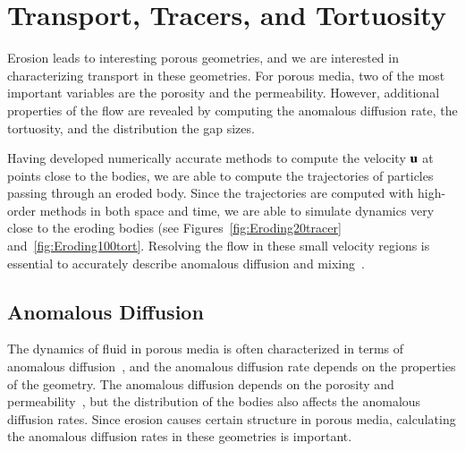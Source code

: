 \documentclass[preprint, 10pt]{elsarticle}
\begin{document}
\section{Transport, Tracers, and Tortuosity}
\label{sec:transport}
Erosion leads to interesting porous geometries, and we are interested in
characterizing transport in these geometries.  For porous media, two of
the most important variables are the porosity and the permeability.
However, additional properties of the flow are revealed by computing
the anomalous diffusion rate, the tortuosity, and the distribution the
gap sizes.

Having developed numerically accurate methods to compute the velocity
${\mathbf{u}}$ at points close to the bodies, we are able to compute the
trajectories of particles passing through an eroded body.  Since the
trajectories are computed with high-order methods in both space and
time,  we are able to simulate dynamics very close to the eroding bodies
(see Figures~\ref{fig:Eroding20tracer} and~\ref{fig:Eroding100tort}.
Resolving the flow in these small velocity regions is essential to
accurately describe anomalous diffusion and
mixing~\cite{leb-den-dav-bol-car-dec-bou2011}.

\subsection{Anomalous Diffusion}
The dynamics of fluid in porous media is often characterized in terms of
anomalous diffusion~\cite{kla-rad-sok2008, den-cor-sch-ber2004}, and the
anomalous diffusion rate depends on the properties of the geometry.  The
anomalous diffusion depends on the porosity and
permeability~\cite{koc-bra1988}, but the distribution of the bodies also
affects the anomalous diffusion rates.  Since erosion causes certain
structure in porous media, calculating the anomalous diffusion rates in
these geometries is important.
\end{document}
